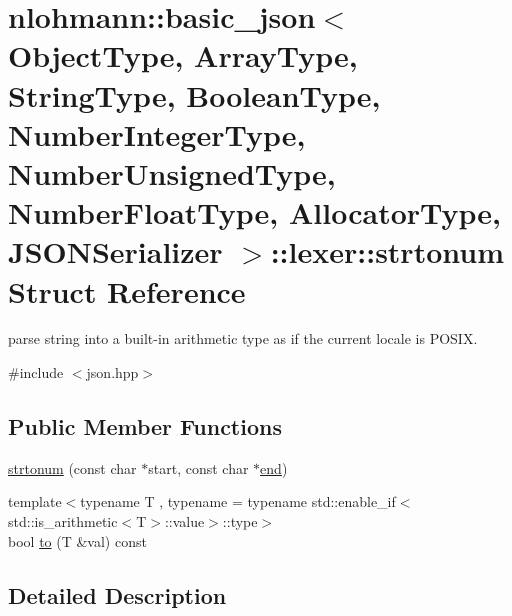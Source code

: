 \hypertarget{structnlohmann_1_1basic__json_1_1lexer_1_1strtonum}{}\section{nlohmann\+::basic\+\_\+json$<$ Object\+Type, Array\+Type, String\+Type, Boolean\+Type, Number\+Integer\+Type, Number\+Unsigned\+Type, Number\+Float\+Type, Allocator\+Type, J\+S\+O\+N\+Serializer $>$\+::lexer\+::strtonum Struct Reference}
\label{structnlohmann_1_1basic__json_1_1lexer_1_1strtonum}


parse string into a built-\/in arithmetic type as if the current locale is P\+O\+S\+IX.  




{\ttfamily \#include $<$json.\+hpp$>$}

\subsection*{Public Member Functions}
\begin{DoxyCompactItemize}
\item 
\mbox{\hyperlink{structnlohmann_1_1basic__json_1_1lexer_1_1strtonum_ae065098e24b08ea79a359950190006d8}{strtonum}} (const char $\ast$start, const char $\ast$\mbox{\hyperlink{classnlohmann_1_1basic__json_a13e032a02a7fd8a93fdddc2fcbc4763c}{end}})
\item 
{\footnotesize template$<$typename T , typename  = typename std\+::enable\+\_\+if$<$std\+::is\+\_\+arithmetic$<$\+T$>$\+::value$>$\+::type$>$ }\\bool \mbox{\hyperlink{structnlohmann_1_1basic__json_1_1lexer_1_1strtonum_af1b3dc99a67a854750437a60a22f4989}{to}} (T \&val) const
\end{DoxyCompactItemize}


\subsection{Detailed Description}
